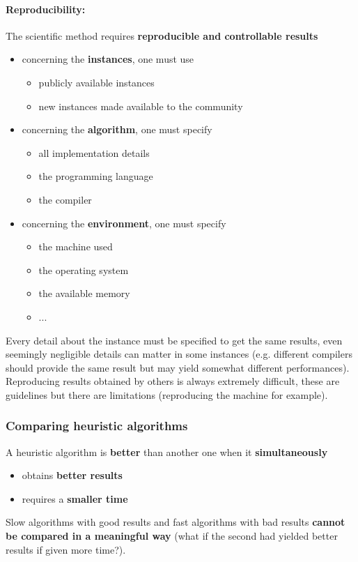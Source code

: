 \documentclass[11pt]{article}
\begin{document}
	\paragraph{Reproducibility:} The scientific method requires \textbf{reproducible and controllable results}
	\begin{itemize}
		\item concerning the \textbf{instances}, one must use
		\begin{itemize}
			\item publicly available instances
			\item new instances made available to the community
		\end{itemize}
		\item concerning the \textbf{algorithm}, one must specify
		\begin{itemize}
			\item all implementation details
			\item the programming language
			\item the compiler
		\end{itemize}
		\item concerning the \textbf{environment}, one must specify
		\begin{itemize}
			\item the machine used
			\item the operating system
			\item the available memory
			\item ... 
		\end{itemize}
	\end{itemize}
	Every detail about the instance must be specified to get the same results, even seemingly negligible details can matter in some instances (e.g. different compilers should provide the same result but may yield somewhat different performances).\\
	
	Reproducing results obtained by others is always extremely difficult, these are guidelines but there are limitations (reproducing the machine for example).\\
	
	\newpage
	
	\subsubsection{Comparing heuristic algorithms}
	A heuristic algorithm is \textbf{better} than another one when it \textbf{simultaneously}
	\begin{itemize}
		\item obtains \textbf{better results}
		\item requires a \textbf{smaller time}
	\end{itemize}
	Slow algorithms with good results and fast algorithms with bad results \textbf{cannot be compared in a meaningful way} (what if the second had yielded better results if given more time?).\\
	
\end{document}
